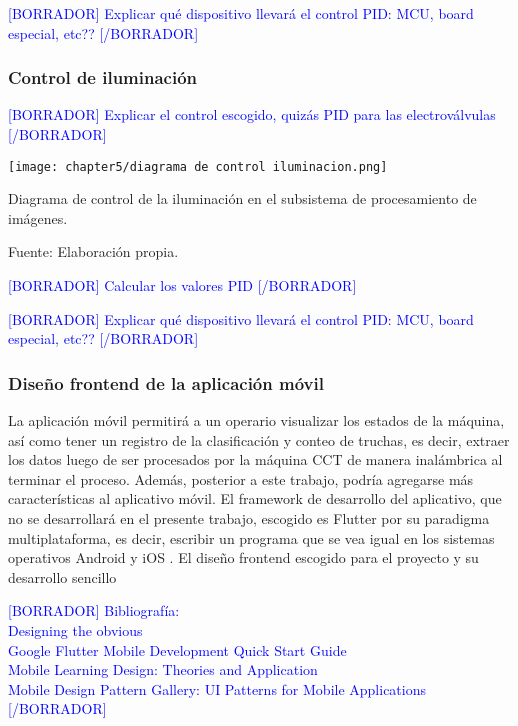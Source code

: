 \textcolor{blue}{[BORRADOR] Explicar qué dispositivo llevará el control PID: MCU, board especial, etc?? [/BORRADOR]}

\subsubsection{Control de iluminación}

\textcolor{blue}{[BORRADOR] Explicar el control escogido, quizás PID para las electroválvulas [/BORRADOR]}

\begin{myfigure}[H]
	\footnotesize\centering
	\texttt{[image: chapter5/diagrama de control iluminacion.png]}
	\caption{Diagrama de control de la iluminación en el subsistema de procesamiento de imágenes.}
	\begin{myflushcenter}
		Fuente: Elaboración propia.
	\end{myflushcenter}
	\label{fig:diagrama de control iluminacion}
\end{myfigure}

\textcolor{blue}{[BORRADOR] Calcular los valores PID [/BORRADOR]}

\textcolor{blue}{[BORRADOR] Explicar qué dispositivo llevará el control PID: MCU, board especial, etc?? [/BORRADOR]}

\subsubsection{Diseño frontend de la aplicación móvil}

La aplicación móvil permitirá a un operario visualizar los estados de la máquina, así como tener un registro de la clasificación y conteo de truchas, es decir, extraer los datos luego de ser procesados por la máquina CCT de manera inalámbrica al terminar el proceso. Además, posterior a este trabajo, podría agregarse más características al aplicativo móvil. El framework de desarrollo del aplicativo, que no se desarrollará en el presente trabajo, escogido es Flutter por su paradigma multiplataforma, es decir, escribir un programa que se vea igual en los sistemas operativos Android y iOS \cite{Simone2020}. El diseño frontend escogido para el proyecto y su desarrollo sencillo 


\textcolor{blue}{[BORRADOR] 
	Bibliografía:\\
	Designing the obvious
	\cite{Joekman2010} \\
	Google Flutter Mobile Development Quick Start Guide
	\cite{PrajyotMainkar2019} \\
	Mobile Learning Design: Theories and Application
	\cite{Churchill2016} \\
	Mobile Design Pattern Gallery: UI Patterns for Mobile Applications
	\cite{Neil2012}
	[/BORRADOR]}



